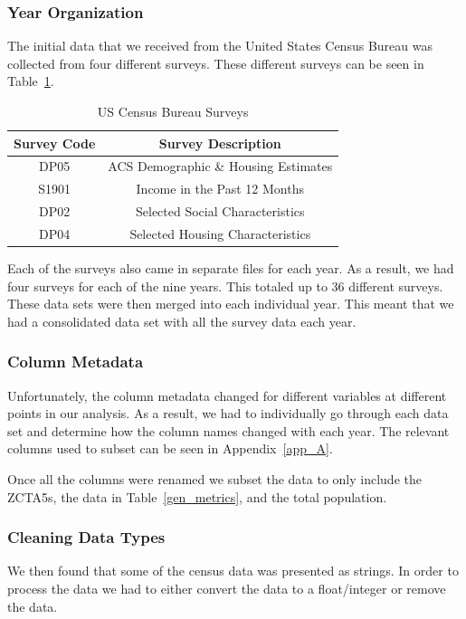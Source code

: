 \documentclass[conference]{IEEEtran}
\begin{document}
\subsubsection{Year Organization}
The initial data that we received from the United States Census Bureau was collected from four different surveys. These different surveys can be seen in Table~\ref{surveys}.
\begin{table}[htbp]
\caption{US Census Bureau Surveys}
\begin{center}
\begin{tabular}{cc}
\hline\hline
\textbf{Survey Code} & \textbf{Survey Description} \\
\hline
DP05 & ACS Demographic \& Housing Estimates\\
S1901 & Income in the Past 12 Months\\
DP02 & Selected Social Characteristics\\
DP04 & Selected Housing Characteristics\\
\hline\hline
\end{tabular}
\label{surveys}
\end{center}
\end{table}
Each of the surveys also came in separate files for each year. As a result, we had four surveys for each of the nine years. This totaled up to 36 different surveys. These data sets were then merged into each individual year. This meant that we had a consolidated data set with all the survey data each year.

\subsubsection{Column Metadata}
Unfortunately, the column metadata changed for different variables at different points in our analysis. As a result, we had to individually go through each data set and determine how the column names changed with each year. The relevant columns used to subset can be seen in Appendix~\ref{app_A}.

Once all the columns were renamed we subset the data to only include the ZCTA5s, the data in Table~\ref{gen_metrics}, and the total population.

\subsubsection{Cleaning Data Types}
We then found that some of the census data was presented as strings. In order to process the data we had to either convert the data to a float/integer or remove the data.
\end{document}
